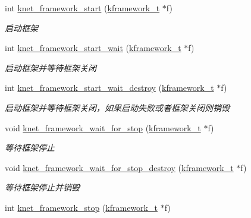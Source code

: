 \begin{DoxyCompactItemize}
int \hyperlink{a00103_gae2bea4af82f4cdce2f4efbf68aa8054c_gae2bea4af82f4cdce2f4efbf68aa8054c}{knet\+\_\+framework\+\_\+start} (\hyperlink{a00051_a3195a3be35782fc1efb920c811be111d_a3195a3be35782fc1efb920c811be111d}{kframework\+\_\+t} $\ast$f)
\begin{DoxyCompactList}\small\item\em 启动框架 \end{DoxyCompactList}\item 
int \hyperlink{a00103_ga5eda19f3b32bb48578cf735e877aac2e_ga5eda19f3b32bb48578cf735e877aac2e}{knet\+\_\+framework\+\_\+start\+\_\+wait} (\hyperlink{a00051_a3195a3be35782fc1efb920c811be111d_a3195a3be35782fc1efb920c811be111d}{kframework\+\_\+t} $\ast$f)
\begin{DoxyCompactList}\small\item\em 启动框架并等待框架关闭 \end{DoxyCompactList}\item 
int \hyperlink{a00103_gab44f183a42eda626fe6ec1e6d35bb859_gab44f183a42eda626fe6ec1e6d35bb859}{knet\+\_\+framework\+\_\+start\+\_\+wait\+\_\+destroy} (\hyperlink{a00051_a3195a3be35782fc1efb920c811be111d_a3195a3be35782fc1efb920c811be111d}{kframework\+\_\+t} $\ast$f)
\begin{DoxyCompactList}\small\item\em 启动框架并等待框架关闭，如果启动失败或者框架关闭则销毁 \end{DoxyCompactList}\item 
void \hyperlink{a00103_gacff434cca9ce60fa5a3597348ee4360b_gacff434cca9ce60fa5a3597348ee4360b}{knet\+\_\+framework\+\_\+wait\+\_\+for\+\_\+stop} (\hyperlink{a00051_a3195a3be35782fc1efb920c811be111d_a3195a3be35782fc1efb920c811be111d}{kframework\+\_\+t} $\ast$f)
\begin{DoxyCompactList}\small\item\em 等待框架停止 \end{DoxyCompactList}\item 
void \hyperlink{a00103_ga5936d2ece03511c366b19bc7616ac8be_ga5936d2ece03511c366b19bc7616ac8be}{knet\+\_\+framework\+\_\+wait\+\_\+for\+\_\+stop\+\_\+destroy} (\hyperlink{a00051_a3195a3be35782fc1efb920c811be111d_a3195a3be35782fc1efb920c811be111d}{kframework\+\_\+t} $\ast$f)
\begin{DoxyCompactList}\small\item\em 等待框架停止并销毁 \end{DoxyCompactList}\item 
int \hyperlink{a00103_gac8f76fe72392bc5103b70fb5b3280839_gac8f76fe72392bc5103b70fb5b3280839}{knet\+\_\+framework\+\_\+stop} (\hyperlink{a00051_a3195a3be35782fc1efb920c811be111d_a3195a3be35782fc1efb920c811be111d}{kframework\+\_\+t} $\ast$f)

\end{DoxyCompactItemize}
